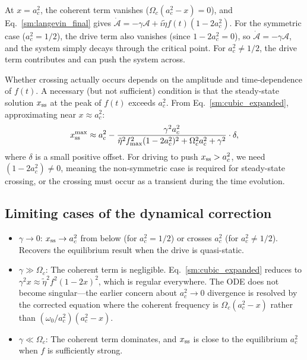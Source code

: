 \documentclass[aps,prd,onecolumn]{revtex4-2}
\begin{document}
At $x = a_c^2$, the coherent term vanishes ($\Omega_c(a_c^2 - x) = 0$), and Eq.~\eqref{sm:langevin_final} gives $\dot{\mathcal{A}} = -\gamma\mathcal{A} + i\tilde{\eta}f(t)(1-2a_c^2)$. For the symmetric case ($a_c^2 = 1/2$), the drive term also vanishes (since $1-2a_c^2 = 0$), so $\dot{\mathcal{A}} = -\gamma\mathcal{A}$, and the system simply decays through the critical point. For $a_c^2 \neq 1/2$, the drive term contributes and can push the system across.

Whether crossing actually occurs depends on the amplitude and time-dependence of $f(t)$. A necessary (but not sufficient) condition is that the steady-state solution $x_{\rm ss}$ at the peak of $f(t)$ exceeds $a_c^2$. From Eq.~\eqref{sm:cubic_expanded}, approximating near $x \approx a_c^2$:
\begin{equation}
x_{\rm ss}^{\rm max} \approx a_c^2 - \frac{\gamma^2 a_c^2}{\tilde{\eta}^2 f_{\rm max}^2 (1-2a_c^2)^2 + \Omega_c^2 a_c^2 + \gamma^2} \cdot \delta,
\label{sm:xmax}
\end{equation}
where $\delta$ is a small positive offset. For driving to push $x_{\rm ss} > a_c^2$, we need $(1-2a_c^2) \neq 0$, meaning the non-symmetric case is required for steady-state crossing, or the crossing must occur as a transient during the time evolution.

\subsection{Limiting cases of the dynamical correction}

\begin{itemize}
\item $\gamma \to 0$: $x_{\rm ss} \to a_c^2$ from below (for $a_c^2 = 1/2$) or crosses $a_c^2$ (for $a_c^2 \neq 1/2$). Recovers the equilibrium result when the drive is quasi-static.
\item $\gamma \gg \Omega_c$: The coherent term is negligible. Eq.~\eqref{sm:cubic_expanded} reduces to $\gamma^2 x \approx \tilde{\eta}^2 f^2 (1-2x)^2$, which is regular everywhere. The ODE does not become singular---the earlier concern about $a_c^2 \to 0$ divergence is resolved by the corrected equation where the coherent frequency is $\Omega_c(a_c^2 - x)$ rather than $(\omega_0/a_c^2)(a_c^2 - x)$.
\item $\gamma \ll \Omega_c$: The coherent term dominates, and $x_{\rm ss}$ is close to the equilibrium $a_c^2$ when $f$ is sufficiently strong.
\end{itemize}
\end{document}
